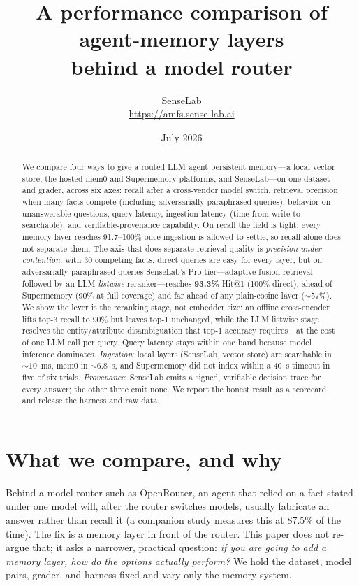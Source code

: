 \documentclass[11pt]{article}
\title{\vspace{-2.2em}\bfseries A performance comparison of agent-memory layers\\
behind a model router}
\author{SenseLab\\[0.3em]\normalsize\url{https://amfs.sense-lab.ai}}
\date{July 2026}
\newcommand{\best}[1]{\textbf{#1}}
\begin{document}
\maketitle
\vspace{-1.2em}

\begin{abstract}
\noindent
We compare four ways to give a routed LLM agent persistent memory---a local vector store, the hosted
mem0 and Supermemory platforms, and SenseLab---on one dataset and grader, across six axes: recall
after a cross-vendor model switch, retrieval precision when many facts compete (including adversarially
paraphrased queries), behavior on unanswerable questions, query latency, ingestion latency (time from
write to searchable), and verifiable-provenance capability. On recall the field is tight: every memory
layer reaches 91.7--100\% once ingestion is allowed to settle, so recall alone does not separate them.
The axis that does separate retrieval quality is \emph{precision under contention}: with 30 competing
facts, direct queries are easy for every layer, but on adversarially paraphrased queries SenseLab's Pro
tier---adaptive-fusion retrieval followed by an LLM \emph{listwise} reranker---reaches \best{93.3\%}
Hit@1 (100\% direct), ahead of Supermemory (90\% at full coverage) and far ahead of any plain-cosine
layer (${\sim}57\%$). We show the lever is the reranking stage, not embedder size: an offline
cross-encoder lifts top-3 recall to 90\% but leaves top-1 unchanged, while the LLM listwise stage
resolves the entity/attribute disambiguation that top-1 accuracy requires---at the cost of one LLM call
per query. Query latency stays within one band because model inference dominates. \emph{Ingestion}:
local layers (SenseLab, vector store) are searchable in ${\sim}10$~ms, mem0 in ${\sim}6.8$~s, and
Supermemory did not index within a 40~s timeout in five of six trials. \emph{Provenance}: SenseLab
emits a signed, verifiable decision trace for every answer; the other three emit none. We report the
honest result as a scorecard and release the harness and raw data.
\end{abstract}

\section{What we compare, and why}

Behind a model router such as OpenRouter, an agent that relied on a fact stated under one model will,
after the router switches models, usually fabricate an answer rather than recall it (a companion study
measures this at 87.5\% of the time). The fix is a memory layer in front of the router. This paper does
not re-argue that; it asks a narrower, practical question: \emph{if you are going to add a memory
layer, how do the options actually perform?} We hold the dataset, model pairs, grader, and harness
fixed and vary only the memory system.
\end{document}
